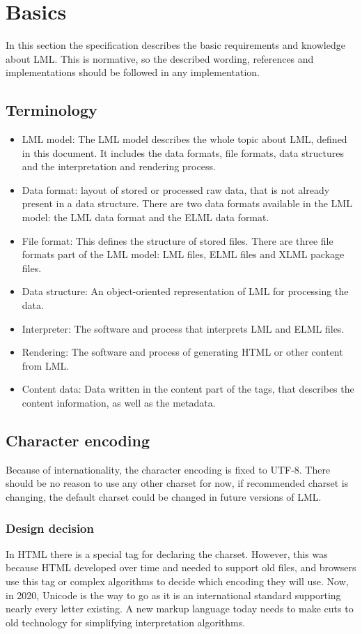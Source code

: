 \documentclass[12pt,a4paper]{article}
\begin{document}
\section{Basics}
In this section the specification describes the basic requirements and knowledge about LML. This is normative, so the described wording, references and implementations should be followed in any implementation.
\subsection{Terminology}
\begin{itemize}
\item LML model: The LML model describes the whole topic about LML, defined in this document. It includes the data formats, file formats, data structures and the interpretation and rendering process.
\item Data format: layout of stored or processed raw data, that is not already present in a data structure. There are two data formats available in the LML model: the LML data format and the ELML data format.
\item File format: This defines the structure of stored files. There are three file formats part of the LML model: LML files, ELML files and XLML package files.
\item Data structure: An object-oriented representation of LML for processing the data.
\item Interpreter: The software and process that interprets LML and ELML files.
\item Rendering: The software and process of generating HTML or other content from LML.
\item Content data: Data written in the content part of the tags, that describes the content information, as well as the metadata.
\end{itemize}


\subsection{Character encoding}
Because of internationality, the character encoding is fixed to UTF-8. There should be no reason to use any other charset for now, if recommended charset is changing, the default charset could be changed in future versions of LML.

\begin{tcolorbox}
\subsubsection*{Design decision}
In HTML there is a special tag for declaring the charset. However, this was because HTML developed over time and needed to support old files, and browsers use this tag or complex algorithms to decide which encoding they will use. Now, in 2020, Unicode is the way to go as it is an international standard supporting nearly every letter existing. A new markup language today needs to make cuts to old technology for simplifying interpretation algorithms.
\end{tcolorbox}
\end{document}
